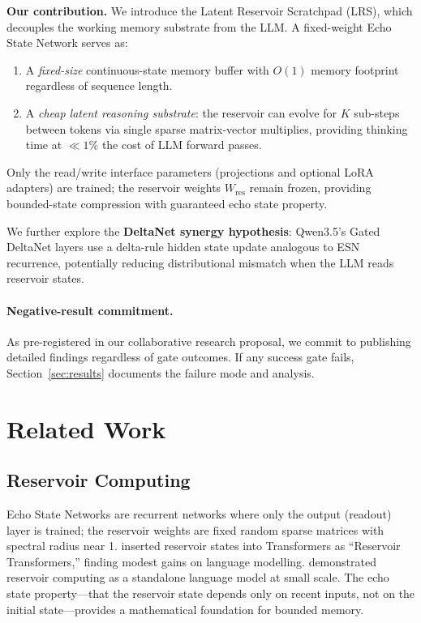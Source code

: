\documentclass[11pt,a4paper]{article}
\newcommand{\LRS}{\textsc{LRS}}
\theoremstyle{definition}
\begin{document}
\textbf{Our contribution.} We introduce the Latent Reservoir Scratchpad
(\LRS), which decouples the working memory substrate from the LLM.  A
fixed-weight Echo State Network \citep{jaeger2001echo} serves as:
\begin{enumerate}
  \item A \emph{fixed-size} continuous-state memory buffer with $O(1)$ memory
    footprint regardless of sequence length.
  \item A \emph{cheap latent reasoning substrate}: the reservoir can evolve
    for $K$ sub-steps between tokens via single sparse matrix-vector
    multiplies, providing thinking time at $\ll 1\%$ the cost of LLM forward
    passes.
\end{enumerate}
Only the read/write interface parameters (projections and optional LoRA
adapters) are trained; the reservoir weights $W_{\mathrm{res}}$ remain frozen,
providing bounded-state compression with guaranteed echo state property.

We further explore the \textbf{DeltaNet synergy hypothesis}: Qwen3.5's Gated
DeltaNet layers \citep{yang2024gated} use a delta-rule hidden state update
analogous to ESN recurrence, potentially reducing distributional mismatch when
the LLM reads reservoir states.

\paragraph{Negative-result commitment.}  As pre-registered in our
collaborative research proposal, we commit to publishing detailed findings
regardless of gate outcomes.  If any success gate fails, Section~\ref{sec:results}
documents the failure mode and analysis.

\section{Related Work}
\label{sec:related}

\subsection{Reservoir Computing}

Echo State Networks \citep{jaeger2001echo,jaeger2004harnessing} are recurrent
networks where only the output (readout) layer is trained; the reservoir
weights are fixed random sparse matrices with spectral radius near 1.
\citet{shen2021reservoir} inserted reservoir states into Transformers as
``Reservoir Transformers,'' finding modest gains on language modelling.
\citet{koester2025reservoir} demonstrated reservoir computing as a standalone
language model at small scale. The echo state property---that the reservoir
state depends only on recent inputs, not on the initial state---provides a
mathematical foundation for bounded memory.
\end{document}
